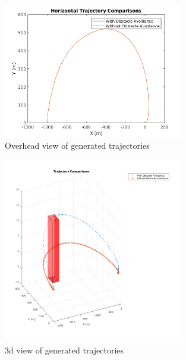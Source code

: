 \documentclass{article}
\begin{document}
\begin{figure}[H]
  \centering
  \includegraphics[width=0.7\textwidth]{images/horizontal_traj.png}
  \caption{Overhead view of generated trajectories}
  \label{fig:overhead-trajectories}
\end{figure}

\begin{figure}[H]
  \centering
  \includegraphics[width=0.7\textwidth]{images/traj.png}
  \caption{3d view of generated trajectories}
  \label{fig:trajectories}
\end{figure}
\end{document}
